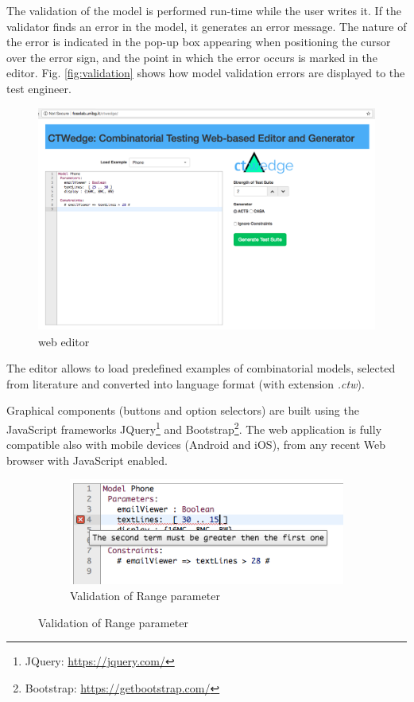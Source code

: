 \begin{tikzborder}{\cite{Gargantini16:validation}}
\begin{tikzborder}{\cite{gargantini_combinatorial_2017}}
\begin{tikzborder}{\cite{garn2019}}
\begin{tikzborder}{\cite{arcaini2019achieving}}
\begin{tikzborder}{}
The validation of the model is performed run-time while the user writes it. If the validator finds an error in the model, it generates an error message. The nature of the error is indicated in the pop-up box appearing when positioning the cursor over the error sign, and the point in which the error occurs is marked in the editor. Fig. \ref{fig:validation} shows how model validation errors are displayed to the test engineer.
\end{tikzborder}
\begin{figure}[bt!]
	\centering
	\includegraphics[width=\textwidth,trim={0 10cm 0 0},clip]{images/editor2.png}
	\caption{\ctwedge web editor}\label{fig:editor}
\end{figure}

\begin{tikzborder}{}
The editor allows to load predefined examples of combinatorial models, selected from literature \cite{segall_using_2011} and converted into \ctwedge language format (with extension \textit{.ctw}).

Graphical components (buttons and option selectors) are built using the JavaScript frameworks JQuery\footnote{JQuery: \url{https://jquery.com/}}
and Bootstrap\footnote{Bootstrap: \url{https://getbootstrap.com/}}.
The web application is fully compatible also with mobile devices (Android and iOS), from any recent Web browser with JavaScript enabled.
\end{tikzborder}

\begin{figure}[bt!]
	\centering
	\begin{subfigure}{\columnwidth}
		\includegraphics[width=.6\columnwidth]{images/validation1.png}\caption{Validation of Range parameter}
	\end{subfigure}
	

\end{figure}
\end{tikzborder}
\end{tikzborder}
\end{tikzborder}
\end{tikzborder}
